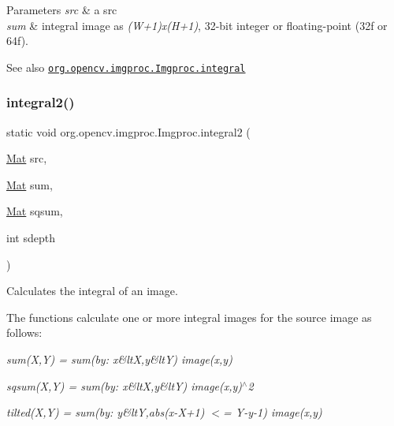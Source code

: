 \begin{DoxyParams}{Parameters}
{\em src} & a src \\
\hline
{\em sum} & integral image as {\itshape (W+1)x(H+1)}, 32-\/bit integer or floating-\/point (32f or 64f).\\
\hline
\end{DoxyParams}
\begin{DoxySeeAlso}{See also}
\href{http://docs.opencv.org/modules/imgproc/doc/miscellaneous_transformations.html#integral}{\tt org.\+opencv.\+imgproc.\+Imgproc.\+integral} 
\end{DoxySeeAlso}
\mbox{\label{classorg_1_1opencv_1_1imgproc_1_1_imgproc_a9df7bb343fe42a9a1fc27e46ec4c54fe}} 
\subsubsection{\texorpdfstring{integral2()}{integral2()}\hspace{0.1cm}{\footnotesize\ttfamily [1/2]}}
{\footnotesize\ttfamily static void org.\+opencv.\+imgproc.\+Imgproc.\+integral2 (\begin{DoxyParamCaption}\item[{\mbox{\hyperlink{classorg_1_1opencv_1_1core_1_1_mat}{Mat}}}]{src,  }\item[{\mbox{\hyperlink{classorg_1_1opencv_1_1core_1_1_mat}{Mat}}}]{sum,  }\item[{\mbox{\hyperlink{classorg_1_1opencv_1_1core_1_1_mat}{Mat}}}]{sqsum,  }\item[{int}]{sdepth }\end{DoxyParamCaption})\hspace{0.3cm}{\ttfamily [static]}}

Calculates the integral of an image.

The functions calculate one or more integral images for the source image as follows\+:

{\itshape sum(\+X,\+Y) = sum(by\+: x\&lt\+X,y\&lt\+Y) image(x,y)}

{\itshape sqsum(\+X,\+Y) = sum(by\+: x\&lt\+X,y\&lt\+Y) image(x,y)$^\wedge$2}

{\itshape tilted(\+X,\+Y) = sum(by\+: y\&ltY,abs(x-\/\+X+1) $<$= Y-\/y-\/1) image(x,y)}

